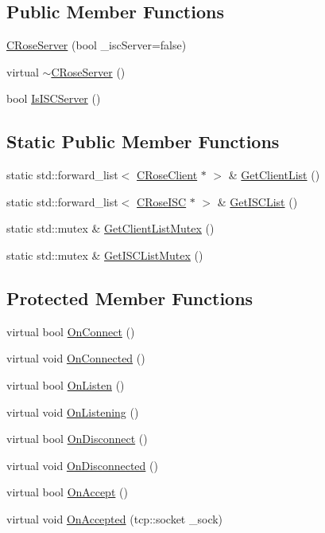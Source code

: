 \subsection*{Public Member Functions}
\begin{DoxyCompactItemize}
\item 
\hyperlink{classCRoseServer_a234b40a76ddf8a497706904e9c00f803}{C\+Rose\+Server} (bool \+\_\+isc\+Server=false)
\item 
virtual \hyperlink{classCRoseServer_acbc6bba08158f00ea4a30158baecfa61}{$\sim$\+C\+Rose\+Server} ()
\item 
bool \hyperlink{classCRoseServer_aec1993c213abb4c7042dfa7f34f63056}{Is\+I\+S\+C\+Server} ()
\end{DoxyCompactItemize}
\subsection*{Static Public Member Functions}
\begin{DoxyCompactItemize}
\item 
static std\+::forward\+\_\+list$<$ \hyperlink{classCRoseClient}{C\+Rose\+Client} $\ast$ $>$ \& \hyperlink{classCRoseServer_ac966dd5bb6c5fce8d944bf36ca540d5a}{Get\+Client\+List} ()
\item 
static std\+::forward\+\_\+list$<$ \hyperlink{classCRoseISC}{C\+Rose\+I\+SC} $\ast$ $>$ \& \hyperlink{classCRoseServer_a2d9018c1f39894f577c93d2150ae814c}{Get\+I\+S\+C\+List} ()
\item 
static std\+::mutex \& \hyperlink{classCRoseServer_a67e74d2f6471ca5a7a0cbe5bf785994d}{Get\+Client\+List\+Mutex} ()
\item 
static std\+::mutex \& \hyperlink{classCRoseServer_a3543ade4bd6b3a295ea2f8f0c530d4dc}{Get\+I\+S\+C\+List\+Mutex} ()
\end{DoxyCompactItemize}
\subsection*{Protected Member Functions}
\begin{DoxyCompactItemize}
\item 
virtual bool \hyperlink{classCRoseServer_aadd11a057c24180d208158579e5c789e}{On\+Connect} ()
\item 
virtual void \hyperlink{classCRoseServer_a872d73971cd9abeb4e33a1e585527072}{On\+Connected} ()
\item 
virtual bool \hyperlink{classCRoseServer_a478acfb0bec99e5637fa3578c586d721}{On\+Listen} ()
\item 
virtual void \hyperlink{classCRoseServer_a82cd8831b5d5b609e7e73bf3fd05ae88}{On\+Listening} ()
\item 
virtual bool \hyperlink{classCRoseServer_ad9bcb3a3768cc66c009dda4c20198e48}{On\+Disconnect} ()
\item 
virtual void \hyperlink{classCRoseServer_a77a5bbc958cafca2a2915e812572a315}{On\+Disconnected} ()
\item 
virtual bool \hyperlink{classCRoseServer_aa7456c38ee795bceb3286eb0f13c7170}{On\+Accept} ()
\item 
virtual void \hyperlink{classCRoseServer_a7d3dc93a0a3495c2233aced6b8ca9733}{On\+Accepted} (tcp\+::socket \+\_\+sock)
\end{DoxyCompactItemize}

